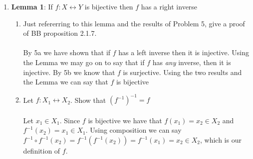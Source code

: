 \documentclass[11pt]{article}
\begin{document}
\begin{enumerate}
\newpage
\item \textbf{Lemma 1}: If $f:X \leftrightarrow Y$ is bijective then $f$ has a right inverse
\begin{enumerate}
\item Just refererring to this lemma and the results of Problem 5, give a proof of BB proposition 2.1.7.\\
\\
By 5a we have shown that if $f$ has a left inverse then it is injective.  Using the Lemma we may go on to say that if $f$ has \emph{any} inverse, then it is injective.  By 5b we know that $f$ is surjective.  Using the two results and the Lemma we can say that $f$ is bijective\\
\item Let $f: X_1 \leftrightarrow X_2$.  Show that $(f^{-1})^{-1} = f$\\\\
Let $x_1 \in X_1$.  Since $f$ is bijective we have that $f(x_1) = x_2 \in X_2$ and $f^{-1}(x_2) = x_1 \in X_1$.  Using composition we can say $f^{-1} \circ f^{-1}(x_2) = f^{-1}(f^{-1}(x_2)) = f^{-1}(x_1) = x_2 \in X_2$, which is our definition of $f$.
\end{enumerate}


\end{enumerate}
\end{document}
